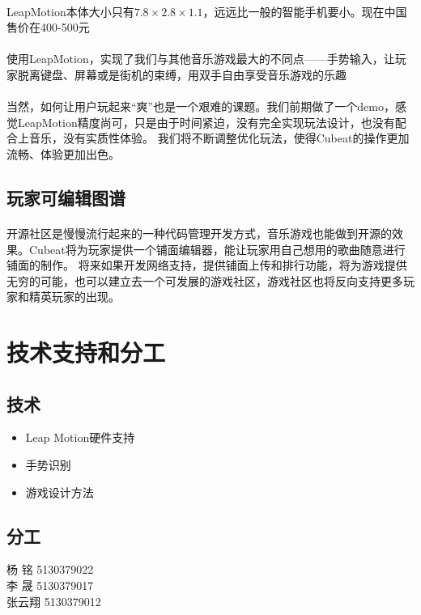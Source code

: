 \documentclass{article} \usepackage{CJK}
\begin{document}
\paragraph{}
LeapMotion本体大小只有$7.8\times2.8\times1.1$，远远比一般的智能手机要小。现在中国售价在400-500元
\paragraph{}
使用LeapMotion，实现了我们与其他音乐游戏最大的不同点——手势输入，让玩家脱离键盘、屏幕或是街机的束缚，用双手自由享受音乐游戏的乐趣
\paragraph{}
当然，如何让用户玩起来“爽”也是一个艰难的课题。我们前期做了一个demo，感觉LeapMotion精度尚可，只是由于时间紧迫，没有完全实现玩法设计，也没有配合上音乐，没有实质性体验。
我们将不断调整优化玩法，使得Cubeat的操作更加流畅、体验更加出色。
\subsection{玩家可编辑图谱}
\paragraph{}
开源社区是慢慢流行起来的一种代码管理开发方式，音乐游戏也能做到开源的效果。Cubeat将为玩家提供一个铺面编辑器，能让玩家用自己想用的歌曲随意进行铺面的制作。
将来如果开发网络支持，提供铺面上传和排行功能，将为游戏提供无穷的可能，也可以建立去一个可发展的游戏社区，游戏社区也将反向支持更多玩家和精英玩家的出现。
\section{技术支持和分工}
\subsection{技术}
\begin{itemize}
  \item Leap Motion硬件支持
  \item 手势识别
  \item 游戏设计方法
\end{itemize}
\subsection{分工}
\begin{description}
  \item[ 杨 铭 5130379022] 
  \item[ 李 晟 5130379017] 
  \item[张云翔 5130379012] 
\end{description}
\end{document}
